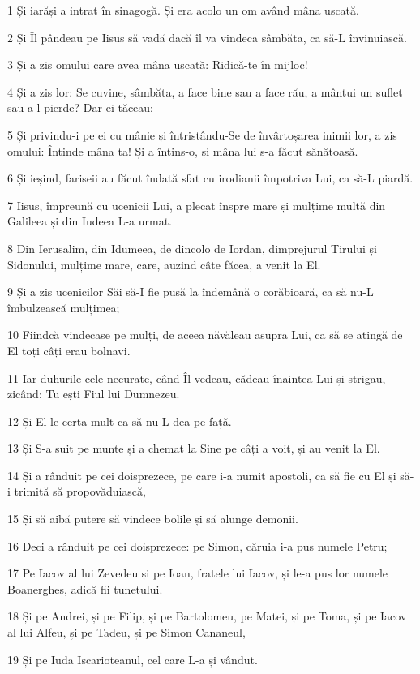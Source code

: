\par 1 Și iarăși a intrat în sinagogă. Și era acolo un om având mâna uscată.
\par 2 Și Îl pândeau pe Iisus să vadă dacă îl va vindeca sâmbăta, ca să-L învinuiască.
\par 3 Și a zis omului care avea mâna uscată: Ridică-te în mijloc!
\par 4 Și a zis lor: Se cuvine, sâmbăta, a face bine sau a face rău, a mântui un suflet sau a-l pierde? Dar ei tăceau;
\par 5 Și privindu-i pe ei cu mânie și întristându-Se de învârtoșarea inimii lor, a zis omului: Întinde mâna ta! Și a întins-o, și mâna lui s-a făcut sănătoasă.
\par 6 Și ieșind, fariseii au făcut îndată sfat cu irodianii împotriva Lui, ca să-L piardă.
\par 7 Iisus, împreună cu ucenicii Lui, a plecat înspre mare și mulțime multă din Galileea și din Iudeea L-a urmat.
\par 8 Din Ierusalim, din Idumeea, de dincolo de Iordan, dimprejurul Tirului și Sidonului, mulțime mare, care, auzind câte făcea, a venit la El.
\par 9 Și a zis ucenicilor Săi să-I fie pusă la îndemână o corăbioară, ca să nu-L îmbulzească mulțimea;
\par 10 Fiindcă vindecase pe mulți, de aceea năvăleau asupra Lui, ca să se atingă de El toți câți erau bolnavi.
\par 11 Iar duhurile cele necurate, când Îl vedeau, cădeau înaintea Lui și strigau, zicând: Tu ești Fiul lui Dumnezeu.
\par 12 Și El le certa mult ca să nu-L dea pe față.
\par 13 Și S-a suit pe munte și a chemat la Sine pe câți a voit, și au venit la El.
\par 14 Și a rânduit pe cei doisprezece, pe care i-a numit apostoli, ca să fie cu El și să-i trimită să propovăduiască,
\par 15 Și să aibă putere să vindece bolile și să alunge demonii.
\par 16 Deci a rânduit pe cei doisprezece: pe Simon, căruia i-a pus numele Petru;
\par 17 Pe Iacov al lui Zevedeu și pe Ioan, fratele lui Iacov, și le-a pus lor numele Boanerghes, adică fii tunetului.
\par 18 Și pe Andrei, și pe Filip, și pe Bartolomeu, pe Matei, și pe Toma, și pe Iacov al lui Alfeu, și pe Tadeu, și pe Simon Cananeul,
\par 19 Și pe Iuda Iscarioteanul, cel care L-a și vândut.
